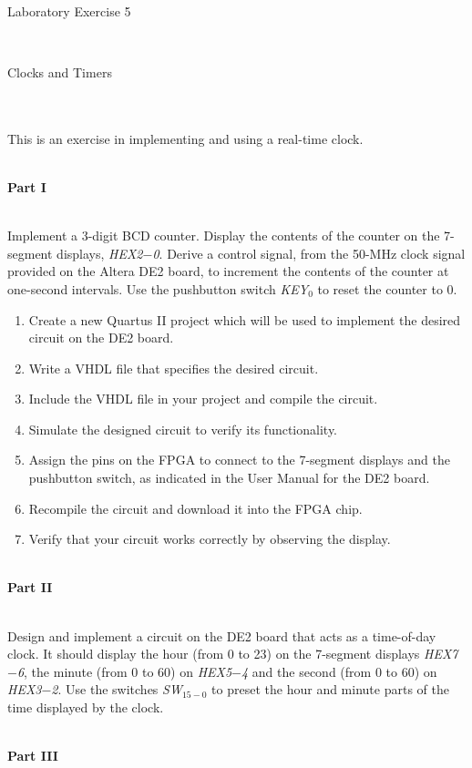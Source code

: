 \documentclass[psfig,10pt,fullpage]{article}
\begin{document}
~\\
~\\
~\\
\centerline{\huge Laboratory Exercise 5}
~\\
\centerline{\large Clocks and Timers}
~\\
~\\

This is an exercise in implementing and using a real-time clock.

~\\
\noindent
{\bf Part I}

~\\
\noindent
Implement a 3-digit BCD counter. Display the contents of the counter 
on the 7-segment displays, {\it HEX2$-$0}. Derive a control signal,
from the 50-MHz clock signal provided on the Altera DE2 board, 
to increment the contents of the counter at one-second intervals. 
Use the pushbutton switch {\it KEY}$_0$ to reset the counter to 0.
\begin{enumerate}
\item Create a new Quartus II project which will be used to implement the desired
circuit on the DE2 board.
\item Write a VHDL file that specifies the desired circuit.
\item Include the VHDL file in your project and compile the circuit.
\item Simulate the designed circuit to verify its functionality.
\item Assign the pins on the FPGA to connect to the 7-segment
displays and the pushbutton switch, 
as indicated in the User Manual for the DE2 board.
\item Recompile the circuit and download it into the FPGA chip.
\item Verify that your circuit works correctly by observing the display.
\end{enumerate}

~\\
\noindent
{\bf Part II}

~\\
\noindent
Design and implement a circuit on the DE2 board that acts as a time-of-day clock.
It should display the hour (from 0 to 23) on the 7-segment displays 
{\it HEX7$-$6}, the minute (from 0 to 60) on {\it HEX5$-$4} and the second (from 0 to 60)
on {\it HEX3$-$2}. Use the switches {\it SW}$_{15-0}$ to preset the hour and minute 
parts of the time displayed by the clock.


~\\
\noindent
{\bf Part III}
\end{document}
